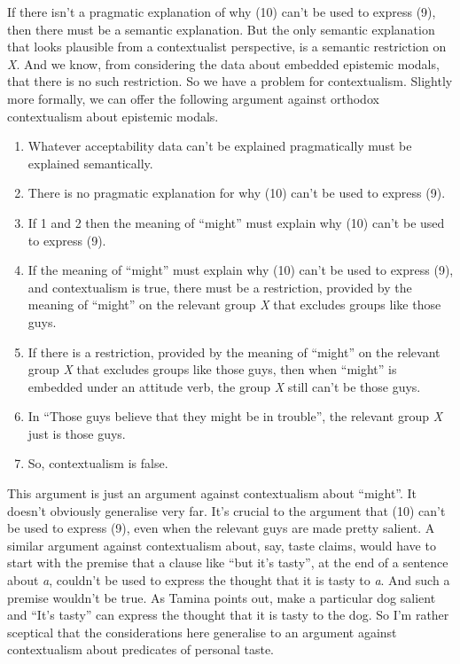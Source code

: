 If there isn't a pragmatic explanation of why (10) can't be used to express (9), then there must be a semantic explanation. But the only semantic explanation that looks plausible from a contextualist perspective, is a semantic restriction on \textit{X}. And we know, from considering the data about embedded epistemic modals, that there is no such restriction. So we have a problem for contextualism. Slightly more formally, we can offer the following argument against orthodox contextualism about epistemic modals.

\renewcommand{\labelenumi}{\arabic{enumi}.}
\begin{enumerate}
\item Whatever acceptability data can't be explained pragmatically must be explained semantically.
\item There is no pragmatic explanation for why (10) can't be used to express (9).
\item If 1 and 2 then the meaning of ``might'' must explain why (10) can't be used to express (9).
\item If the meaning of ``might'' must explain why (10) can't be used to express (9), and contextualism is true, there must be a restriction, provided by the meaning of ``might'' on the relevant group \textit{X} that excludes groups like those guys.
\item If there is a restriction, provided by the meaning of ``might'' on the relevant group \textit{X} that excludes groups like those guys, then when ``might'' is embedded under an attitude verb, the group \textit{X} still can't be those guys.
\item In ``Those guys believe that they might be in trouble'', the relevant group \textit{X} just is those guys.
\item So, contextualism is false.
\end{enumerate}

\noindent This argument is just an argument against contextualism about ``might''. It doesn't obviously generalise very far. It's crucial to the argument that (10) can't be used to express (9), even when the relevant guys are made pretty salient. A similar argument against contextualism about, say, taste claims, would have to start with the premise that a clause like ``but it's tasty'', at the end of a sentence about \textit{a}, couldn't be used to express the thought that it is tasty to \textit{a}. And such a premise wouldn't be true. As Tamina \citet{Stephenson2007} points out, make a particular dog salient and ``It's tasty'' can express the thought that it is tasty to the dog. So I'm rather sceptical that the considerations here generalise to an argument against contextualism about predicates of personal taste.

